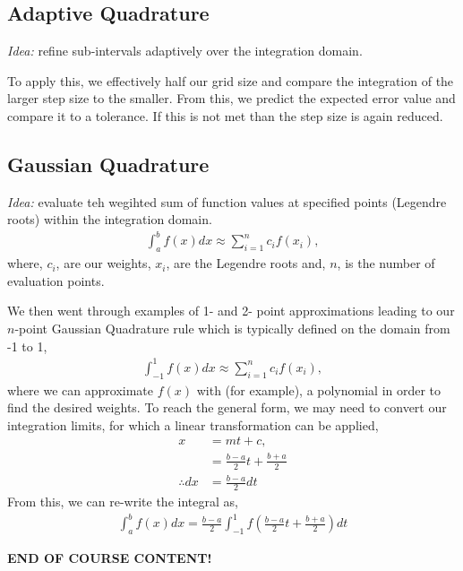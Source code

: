 \documentclass[11pt,a4paper]{report}
\begin{document}
	\subsection{Adaptive Quadrature}
	\textit{Idea:} refine sub-intervals adaptively over the integration domain.
	
	To apply this, we effectively half our grid size and compare the integration of the larger step size to the smaller. From this, we predict the expected error value and compare it to a tolerance. If this is not met than the step size is again reduced.
	
	\subsection{Gaussian Quadrature}
	\textit{Idea:} evaluate teh wegihted sum of function values at specified points (Legendre roots) within the integration domain.
	\begin{align}
		\int_a^b f(x) dx \approx \sum_{i=1}^n c_i f(x_i),
	\end{align}
	where, $c_i$, are our weights, $x_i$, are the Legendre roots and, $n$, is the number of evaluation points.
	
	We then went through examples of 1- and 2- point approximations leading to our $n$-point Gaussian Quadrature rule which is typically defined on the domain from -1 to 1,
	\begin{align}
		\int_{-1}^1 f(x) dx \approx \sum_{i=1}^{n} c_i f(x_i),
	\end{align}
	where we can approximate $f(x)$ with (for example), a polynomial in order to find the desired weights. To reach the general form, we may need to convert our integration limits, for which a linear transformation can be applied,
	\begin{align}
		x&=mt + c, \\
		 &=\frac{b-a}{2} t + \frac{b+a}{2} \\
		 \therefore dx &= \frac{b-a}{2} dt
	\end{align}
	From this, we can re-write the integral as,
	\begin{align}
		\int_{a}^b f(x) dx = \frac{b-a}{2}  \int_{-1}^1 f\left(\frac{b-a}{2} t + \frac{b+a}{2}\right) dt
	\end{align}
	
	\centering
	\textbf{END OF COURSE CONTENT!}
\end{document}
